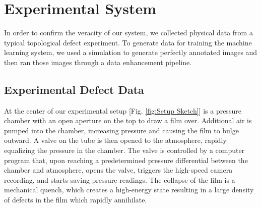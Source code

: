 \documentclass[prl,reprint,showpacs,floatfix,nofootinbib]{revtex4-1}
\begin{document}
%

\section{Experimental System}


In order to confirm the veracity of our system, we collected physical data from a typical topological defect experiment.
To generate data for training the machine learning system, we used a simulation to generate perfectly annotated images and then ran those images through a data enhancement pipeline.




\subsection{Experimental Defect Data}

At the center of our experimental setup [Fig. \ref{fig:Setup Sketch}] is a pressure chamber with an open aperture on the top to draw a film over. Additional air is pumped into the chamber, increasing pressure and causing the film to bulge outward. A valve on the tube is then opened to the atmosphere, rapidly equalizing the pressure in the chamber. The valve is controlled by a computer program that, upon reaching a predetermined pressure differential between the chamber and atmosphere, opens the valve, triggers the high-speed camera recording, and starts saving pressure readings.  The collapse of the film is a mechanical quench, which creates a high-energy state resulting in a large density of defects in the film which rapidly annihilate.
\end{document}
